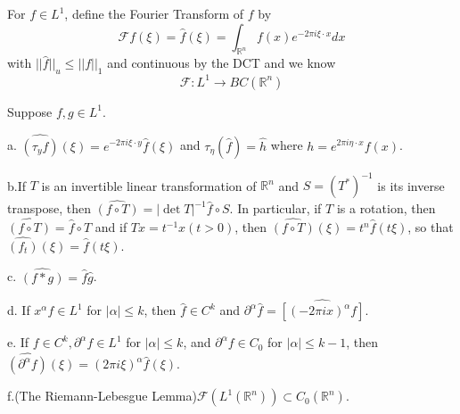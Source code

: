 \documentclass[lang=en, color=blue, ]{elegantbook}
\newcommand{\F}{\mathcal{F}}
\newcommand{\R}{\mathbb{R}}
\begin{document}
\begin{definition}
    For $f\in L^1$, define the Fourier Transform of $f$ by
    \[\F f(\xi) = \hat{f}(\xi) = \int_{\R^n}f(x)e^{-2\pi i\xi\cdot x} dx\]
    with $||\hat{f}||_u \leq ||f||_1$ and continuous by the DCT and we know
    \[\F:L^1 \to BC(\R^n)\]
\end{definition}
\begin{theorem}
    Suppose $f,g\in L^1$.\par
    a. $\hat{(\tau_y f)}(\xi) = e^{-2\pi i \xi\cdot y}\hat{f}(\xi)$ and $\tau_{\eta}(\hat{f}) = \hat{h}$ where $h = e^{2\pi i \eta\cdot x}f(x)$.\par
    b.If $T$ is an invertible linear transformation of $\R^n$ and $S = (T^*)^{-1}$ is its inverse transpose, then $\hat{(f\circ T)} = |\det T|^{-1} \hat{f}\circ S$. In particular, if $T$ is a rotation, then $\hat{(f\circ T)} = \hat{f}\circ T$ and if $Tx = t^{-1}x(t>0)$, then $\hat{(f\circ T)}(\xi) = t^n\hat{f}(t\xi)$, so that $\hat{(f_t)}(\xi) = \hat{f}(t\xi)$.\par
    c. $\hat{(f*g)} = \hat{f}\hat{g}$.\par
    d. If $x^{\alpha}f\in L^1$ for $|\alpha|\leq k$, then $\hat{f}\in C^k$ and $\partial^{\alpha}\hat{f} = \hat{[(-2\pi i x)^{\alpha}f]}$.\par
    e. If $f\in C^k,\partial^{\alpha} f \in L^1$ for $|\alpha|\leq k$, and $\partial^{\alpha}f\in C_0$ for $|\alpha|\leq k -1$, then $\hat{(\partial^{\alpha}f)}(\xi) = (2\pi i \xi)^{\alpha}\hat{f}(\xi)$.\par
    f.(The Riemann-Lebesgue Lemma)$\F(L^1(\R^n)) \subset C_0(\R^n)$.
\end{theorem}
\end{document}
